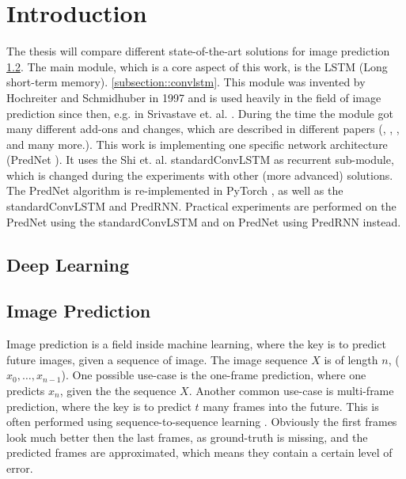 \section{Introduction} \label{section::introduction}
 The thesis will compare different state-of-the-art solutions for image prediction \ref{subsection::imageprediction}.
 The main module, which is a core aspect of this work, is the LSTM (Long short-term memory). \ref{subsection::convlstm}.
 This module was invented by Hochreiter and Schmidhuber  \cite{Hochreiter1997} in 1997 and is used heavily in the field of image prediction since then, e.g. in Srivastave et. al. 
 \cite{Srivastava2015}.
 During the time the module got many different add-ons and changes, which are described in different papers (\cite{Patraucean2015}, \cite{Lotter2016}, \cite{Wang2017}, \cite{Wang2018} and many 
 more.). This work is implementing one specific network architecture (PredNet \cite{Lotter2016}).
 It uses the Shi et. al. \glqq standard\grqq ConvLSTM \cite{Shi2015} as recurrent sub-module, which is changed during the experiments
 with other (more advanced) solutions. The PredNet algorithm is re-implemented in PyTorch \cite{Paszke2019}, as well as the \glqq standard\grqq ConvLSTM and PredRNN.
 Practical experiments are performed on the PredNet using the \glqq standard\grqq ConvLSTM
 and on PredNet using PredRNN instead.
 
 \subsection{Deep Learning} \label{subsection::deeplearning}
 
 \subsection{Image Prediction} \label{subsection::imageprediction}
  Image prediction is a field inside machine learning, where the key is to predict future images, given a sequence of image. The image sequence $X$ is of length $n$, ($x_0, \ldots, x_{n-1}$).
  One possible use-case is the one-frame prediction, where one predicts $x_n$, given the the sequence $X$. Another common use-case is multi-frame prediction, where the key is to predict $t$ many
  frames into the future. This is often performed using sequence-to-sequence learning \cite{Sutskever2014}. Obviously the first frames look much better then the last frames, as ground-truth is 
  missing, and the predicted frames are approximated, which means they contain a certain level of error.

